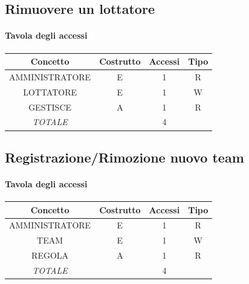 \documentclass[a4paper,12pt]{report}
\begin{document}
\subsection{Rimuovere un lottatore}
\begin{table}[H]
    \paragraph{Tavola degli accessi\newline}
    \begin{tabular}{|c|c|c|c|}
    \hline
    Concetto          & Costrutto & Accessi & Tipo \\ \hline
    AMMINISTRATORE    & E         & 1       & R    \\ \hline
    LOTTATORE         & E         & 1       & W    \\ \hline
    GESTISCE          & A         & 1       & R    \\ \hline
    \textit{TOTALE}   &           & 4       &      \\ \hline
    \end{tabular}
\end{table}

\subsection{Registrazione/Rimozione nuovo team}
\begin{table}[H]
    \paragraph{Tavola degli accessi\newline}
    \begin{tabular}{|c|c|c|c|}
    \hline
    Concetto          & Costrutto & Accessi & Tipo \\ \hline
    AMMINISTRATORE    & E         & 1       & R    \\ \hline
    TEAM              & E         & 1       & W    \\ \hline
    REGOLA            & A         & 1       & R    \\ \hline
    \textit{TOTALE}   &           & 4       &      \\ \hline
    \end{tabular}
\end{table}
\end{document}
